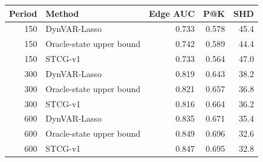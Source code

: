 \begin{tabular}{rlrrr}
\toprule
Period & Method & Edge AUC & P@K & SHD \\
\midrule
150 & DynVAR-Lasso & 0.733 & 0.578 & 45.4 \\
150 & Oracle-state upper bound & 0.742 & 0.589 & 44.4 \\
150 & STCG-v1 & 0.733 & 0.564 & 47.0 \\
300 & DynVAR-Lasso & 0.819 & 0.643 & 38.2 \\
300 & Oracle-state upper bound & 0.821 & 0.657 & 36.8 \\
300 & STCG-v1 & 0.816 & 0.664 & 36.2 \\
600 & DynVAR-Lasso & 0.835 & 0.671 & 35.4 \\
600 & Oracle-state upper bound & 0.849 & 0.696 & 32.6 \\
600 & STCG-v1 & 0.847 & 0.695 & 32.8 \\
\bottomrule
\end{tabular}

